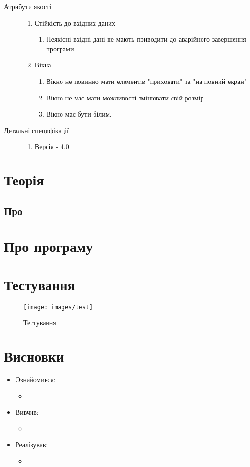 \begin{description}
\begin{enumerate}
		\end{enumerate}
	\item[Атрибути якості]\directenv
		\begin{enumerate}
			\item Стійкість до вхідних даних
				\begin{enumerate}
					\item Неякісні вхідні дані не мають приводити до аварійного завершення програми
				\end{enumerate}
			\item Вікна
				\begin{enumerate}
					\item Вікно не повинно мати елементів "приховати" та "на повний екран"
					\item Вікно не має мати можливості змінювати свій розмір
					\item Вікно має бути білим.
				\end{enumerate}
		\end{enumerate}
	\item[Детальні специфікації]\directenv
		\begin{enumerate}
			\item Версія  - 4.0
		\end{enumerate}
\end{description}


\section{Теорія}
\subsection{Про }

\section{Про програму}

\section{Тестування}
\begin{figure}[H]
	\centering
	\texttt{[image: images/test]}
	\caption{Тестування}
	\label{fig:tag}
\end{figure}

\section{Висновки}
\begin{itemize}
	\item Ознайомився:
		\begin{itemize}
			\item
		\end{itemize}
	\item Вивчив:
		\begin{itemize}
			\item 
		\end{itemize}
	\item Реалізував:
		\begin{itemize}
			\item
		\end{itemize}
\end{itemize}